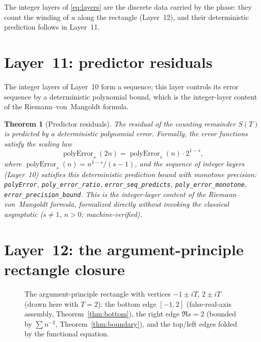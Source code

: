 \documentclass{article}
\newtheorem{theorem}{Theorem}[section]
\newcommand{\GG}{\Gamma}
\begin{document}
The integer layers of \eqref{eq:layers} are the discrete data carried by the
phase: they count the winding of $u$ along the rectangle (Layer~12), and
their deterministic prediction follows in Layer~11.

\section{Layer~11: predictor residuals}
\label{sec:L11}

The integer layers of Layer~10 form a sequence; this layer controls its
error sequence by a deterministic polynomial bound, which is the
integer-layer content of the Riemann--von~Mangoldt formula.

\begin{theorem}[Predictor residuals]
\label{thm:residual}
The residual of the counting remainder $S(T)$ is predicted by a
deterministic polynomial error. Formally, the error functions satisfy the
scaling law
\[
\operatorname{polyError}_s(2n)=\operatorname{polyError}_s(n)\cdot2^{1-s},
\]
where $\operatorname{polyError}_s(n)=n^{1-s}/(s-1)$, and the sequence of
integer layers (Layer~10) satisfies this deterministic prediction bound
with monotone precision: \texttt{polyError}, \texttt{poly\_error\_ratio},
\texttt{error\_seq\_predicts}, \texttt{poly\_error\_monotone},
\texttt{error\_precision\_bound}. This is the integer-layer content of the
Riemann--von~Mangoldt formula, formalized directly without invoking the
classical asymptotic ($s\neq1$, $n>0$; machine-verified).
\end{theorem}

\section{Layer~12: the argument-principle rectangle closure}
\label{sec:L12}

\begin{figure}[h]
\centering
{}
\caption{The argument-principle rectangle with vertices
$-1\pm iT$, $2\pm iT$ (drawn here with $T=2$):
the bottom edge $[-1,2]$ (false-real-axis assembly, Theorem~\ref{thm:bottom}),
the right edge $\Re s=2$ (bounded by $\sum n^{-2}$,
Theorem~\ref{thm:boundary}), and the top/left edges folded by the
functional equation.}
\label{fig:rect}
\end{figure}
\end{document}
